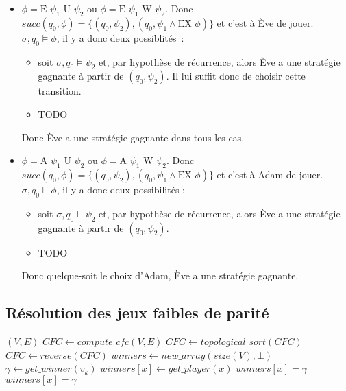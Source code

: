 \documentclass[10pt,a4paper]{article}
\begin{document}
\begin{itemize}
\item $\phi = \mbox{E } \psi_1 \mbox{ U } \psi_2$ ou $\phi = \mbox{E } \psi_1 \mbox{ W } \psi_2$. Donc $succ(q_0,\phi) = \{ (q_0,\psi_2), (q_0,\psi_1 \land \mbox{EX }  \phi) \}$ et c'est à Ève de jouer. $\sigma,q_0 \vDash \phi$, il y a donc deux possiblités :
\begin{itemize}
	\item soit $\sigma,q_0 \vDash \psi_2$ et, par hypothèse de récurrence, alors Ève a une stratégie gagnante à partir de $(q_0,\psi_2)$. Il lui suffit donc de choisir cette transition.
	\item TODO
\end{itemize}
Donc Ève a une stratégie gagnante dans tous les cas.

\item $\phi = \mbox{A } \psi_1 \mbox{ U } \psi_2$ ou $\phi = \mbox{A } \psi_1 \mbox{ W } \psi_2$. Donc $succ(q_0,\phi) = \{ (q_0,\psi_2), (q_0,\psi_1 \land \mbox{EX }  \phi) \}$ et c'est à Adam de jouer. $\sigma,q_0 \vDash \phi$, il y a donc deux possibilités :
\begin{itemize}
	\item soit $\sigma,q_0 \vDash \psi_2$ et, par hypothèse de récurrence, alors Ève a une stratégie gagnante à partir de $(q_0,\psi_2)$.
	\item TODO
\end{itemize}
Donc quelque-soit le choix d'Adam, Ève a une stratégie gagnante.
\end{itemize}

\subsection{Résolution des jeux faibles de parité}
\begin{algorithmic}[1]
	\REQUIRE $(V, E)$ 
	\STATE $CFC \leftarrow compute\_cfc(V, E)$
	\STATE $CFC \leftarrow topological\_sort(CFC)$
	\STATE $CFC \leftarrow reverse(CFC)$
	\STATE $winners \leftarrow new\_array(size(V), \bot)$
		\STATE $\gamma \leftarrow get\_winner(v_k)$
						\STATE $winners[x] \leftarrow get\_player(x)$
					\ENDIF
				\ENDFOR
					\STATE $winners[x] = \gamma$
				\ENDIF
			\ELSE
				\STATE $winners[x] = \gamma$
			\ENDIF
		\ENDFOR
	\ENDFOR




\end{algorithmic}
\end{document}

